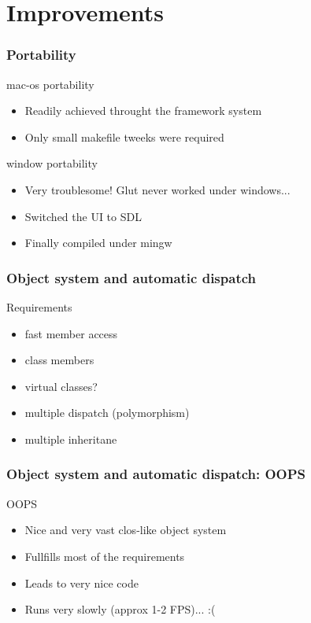\documentclass{beamer}
\newcommand{\<}[1]{\`#1}
\begin{document}


\section{Improvements}

\begin{frame}
  \frametitle{Portability}
  \begin{block}{mac-os portability}
    \begin{itemize}
    \item Readily achieved throught the framework system
    \item Only small makefile tweeks were required
    \end{itemize}
  \end{block}

  \begin{block}{window portability}
    \begin{itemize}
    \item Very troublesome! Glut never worked under windows...
    \item Switched the UI to SDL
    \item Finally compiled under mingw
    \end{itemize}
  \end{block}
\end{frame}

\begin{frame}
  \frametitle{Object system and automatic dispatch}

  \begin{block}{Requirements}
    \begin{itemize}
    \item fast member access
    \item class members
    \item virtual classes?
    \item multiple dispatch (polymorphism)
    \item multiple inheritane
    \end{itemize}
  \end{block}

\end{frame}

\begin{frame}
  \frametitle{Object system and automatic dispatch: OOPS}

  \begin{block}{OOPS}
    \begin{itemize}
    \item Nice and very vast clos-like object system
    \item Fullfills most of the requirements
    \item Leads to very nice code
    \item Runs very \alert{slowly} (approx 1-2 FPS)... :(
    \end{itemize}
  \end{block}

\end{frame}
\end{document}
